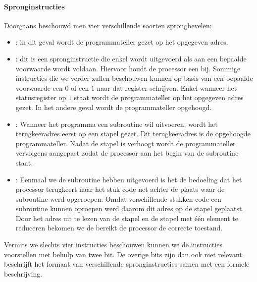 \paragraph{Spronginstructies}
Doorgaans beschouwd men vier verschillende soorten sprongbevelen:
\begin{itemize}
 \item {}: in dit geval wordt de programmateller gezet op het opgegeven adres.
 \item {}: dit is een spronginstructie die enkel wordt uitgevoerd als aan een bepaalde voorwaarde wordt voldaan. Hiervoor houdt de processor een  bij. Sommige instructies die we verder zullen beschouwen kunnen op basis van een bepaalde voorwaarde een $0$ of een $1$ naar dat register schrijven. Enkel wanneer het statusregister op $1$ staat wordt de programmateller op het opgegeven adres gezet. In het andere geval wordt de programmateller opgehoogd.
 \item {}: Wanneer het programma een subroutine wil uitvoeren, wordt het terugkeeradres eerst op een stapel gezet. Dit terugkeeradres is de opgehoogde programmateller. Nadat de stapel is verhoogt wordt de programmateller vervolgens aangepast zodat de processor aan het begin van de subroutine staat.
 \item {}: Eenmaal we de subroutine hebben uitgevoerd is het de bedoeling dat het processor terugkeert naar het stuk code net achter de plaats waar de subroutine werd opgeroepen. Omdat verschillende stukken code een subroutine kunnen oproepen werd daarom dit adres op de stapel geplaatst. Door het adres uit te lezen van de stapel en de stapel met \'e\'en element te reduceren bekomen we de bereikt de processor de correcte toestand.
\end{itemize}
Vermits we slechts vier instructies beschouwen kunnen we de instructies voorstellen met behulp van twee bit. De overige bits zijn dan ook niet relevant.  beschrijft het formaat van verschillende spronginstructies samen met een formele beschrijving.
